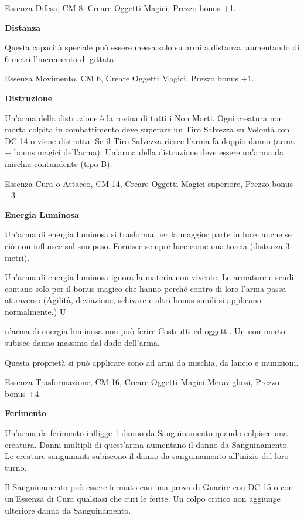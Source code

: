 \documentclass[a4paper,11pt,twoside,openany]{book}
\begin{document}
{Essenza Difesa, CM 8, Creare Oggetti Magici, Prezzo bonus +1.

\textbf{Distanza}

Questa capacità speciale può essere messa solo su armi a distanza, aumentando di 6 metri l'incremento di gittata.

Essenza Movimento, CM 6, Creare Oggetti Magici, Prezzo bonus +1.

\textbf{Distruzione}

Un'arma della distruzione è la rovina di tutti i Non Morti. Ogni creatura non morta colpita in combattimento deve superare un Tiro Salvezza su Volontà con DC 14 o viene distrutta. Se il Tiro Salvezza riesce l'arma fa doppio danno (arma + bonus magici dell'arma). Un'arma della distruzione deve essere un'arma da mischia contundente (tipo B).

Essenza Cura o Attacco, CM 14, Creare Oggetti Magici superiore, Prezzo bonus +3

\textbf{Energia Luminosa}

Un'arma di energia luminosa si trasforma per la maggior parte in luce, anche se ciò non influisce sul suo peso. Fornisce sempre luce come una torcia (distanza 3 metri). 

Un'arma di energia luminosa ignora la materia non vivente. Le armature e scudi contano solo per il bonus magico che hanno perché contro di loro l'arma passa attraverso (Agilità, deviazione, schivare e altri bonus simili si applicano normalmente.) U

n'arma di energia luminosa non può ferire Costrutti ed oggetti. Un non-morto subisce danno massimo dal dado dell'arma. 

Questa proprietà si può applicare sono ad armi da mischia, da lancio e munizioni. 

Essenza Trasformazione, CM 16, Creare Oggetti Magici Meravigliosi, Prezzo bonus +4.

\textbf{Ferimento}

Un'arma da ferimento infligge 1 danno da Sanguinamento quando colpisce una creatura. Danni multipli di quest'arma aumentano il danno da Sanguinamento. Le creature sanguinanti subiscono il danno da sanguinamento all'inizio del loro turno.

Il Sanguinamento può essere fermato con una prova di Guarire con DC 15 o con un'Essenza di Cura qualsiasi che curi le ferite. Un colpo critico non aggiunge ulteriore danno da Sanguinamento.

}
\end{document}
